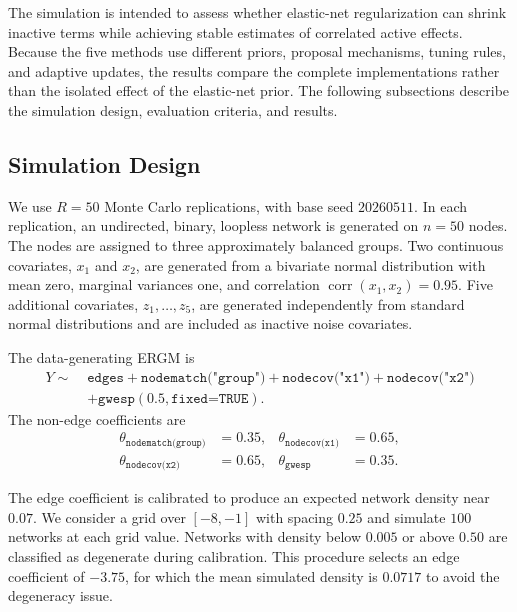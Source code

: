 \documentclass[preprint,12pt,authoryear]{elsarticle}
\begin{document}
The simulation is intended to assess whether elastic-net regularization can
shrink inactive terms while achieving stable estimates of correlated active
effects. Because the five methods use different priors, proposal mechanisms,
tuning rules, and adaptive updates, the results compare the complete
implementations rather than the isolated effect of the elastic-net prior. The
following subsections describe the simulation design, evaluation criteria, and
results.

\subsection{Simulation Design}

We use \(R=50\) Monte Carlo replications, with base seed \(20260511\). In each
replication, an undirected, binary, loopless network is generated on \(n=50\)
nodes. The nodes are assigned to three approximately balanced groups. Two
continuous covariates, \(x_1\) and \(x_2\), are generated from a bivariate
normal distribution with mean zero, marginal variances one, and correlation $
\operatorname{corr}(x_1,x_2)=0.95.$
Five additional covariates, \(z_1,\ldots,z_5\), are generated independently
from standard normal distributions and are included as inactive noise
covariates.

The data-generating ERGM is
\[
\begin{aligned}
Y\sim\;&
\texttt{edges}
+\texttt{nodematch("group")}
+\texttt{nodecov("x1")}
+\texttt{nodecov("x2")}\\
&+\texttt{gwesp}(0.5,\texttt{fixed=TRUE}).
\end{aligned}
\]
The non-edge coefficients are
\[
\begin{aligned}
\theta_{\texttt{nodematch(group)}}&=0.35, &
\theta_{\texttt{nodecov(x1)}}&=0.65,\\
\theta_{\texttt{nodecov(x2)}}&=0.65, &
\theta_{\texttt{gwesp}}&=0.35.
\end{aligned}
\]

The edge coefficient is calibrated to produce an expected network density near
\(0.07\). We consider a grid over \([-8,-1]\) with spacing \(0.25\) and
simulate \(100\) networks at each grid value. Networks with density below
\(0.005\) or above \(0.50\) are classified as degenerate during calibration.
This procedure selects an edge coefficient of \(-3.75\), for which the mean
simulated density is \(0.0717\) to avoid the degeneracy issue.
\end{document}

